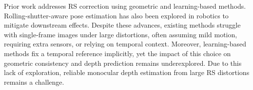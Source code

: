 Prior work addresses RS correction using geometric and learning-based methods. Rolling-shutter-aware pose estimation has also been explored in robotics to mitigate downstream effects.
Despite these advances, existing methods struggle with single-frame images under large distortions, often assuming mild motion, requiring extra sensors, or relying on temporal context. Moreover, learning-based methods fix a temporal reference implicitly, yet the impact of this choice on geometric consistency and depth prediction remains underexplored. Due to this lack of exploration, reliable monocular depth estimation from large RS distortions remains a challenge.





